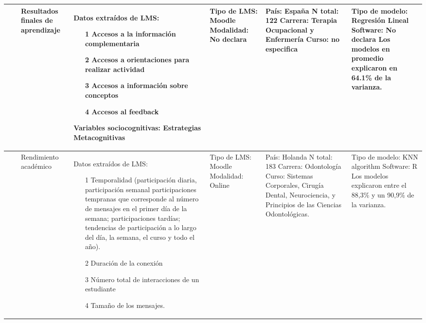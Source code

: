 \documentclass[spanish]{textolivre}
\begin{document}
\begin{small}
\begin{longtable}{
    >{\raggedright\arraybackslash}p{}
    p{}
    p{}
    p{}
    p{}
    p{}
    p{}
    }
\\
\midrule
7 & \cite{saiz_manzanares2018} & Resultados finales de
aprendizaje & Datos extraídos de LMS:
\begin{itemize}
\item[1] Accesos a la información complementaria  
\item[2] Accesos a orientaciones para realizar actividad  
\item[3] Accesos a información sobre conceptos
\item[4] Accesos al feedback
\end{itemize}
Variables sociocognitivas: \newline Estrategias Metacognitivas
& Tipo de LMS: Moodle \newline Modalidad: No declara & País: España \newline N total: 122 \newline Carrera: Terapia Ocupacional y Enfermería \newline Curso: no especifica & Tipo de modelo: Regresión Lineal \newline Software: No declara \newline Los modelos en promedio explicaron en 64.1\% de la varianza.
\\
\midrule
8 & \cite{saqr2019} & Rendimiento académico	& Datos extraídos de LMS:
\begin{itemize}
\item[1] Temporalidad (participación diaria, participación semanal participaciones tempranas que corresponde al número de mensajes en el primer día de la semana; participaciones tardías; tendencias de participación a lo largo del día, la semana, el curso y todo el año).
\item[2] Duración de la conexión
\item[3] Número total de interacciones de un estudiante
\item[4] Tamaño de los mensajes.
\end{itemize} & Tipo de LMS: Moodle \newline Modalidad:
Online & País: Holanda \newline N total: 183 \newline Carrera: Odontología \newline Curso: Sistemas Corporales, Cirugía Dental, Neurociencia, y Principios de las Ciencias Odontológicas. & Tipo de modelo: KNN algorithm \newline Software: R \newline Los modelos explicaron entre el 88,3\% y un 90,9\% de la varianza.

\end{longtable}
\end{small}
\end{document}
